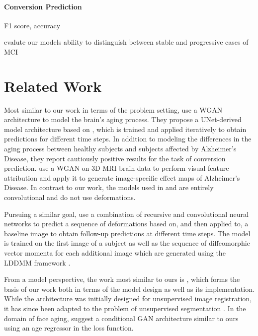 
\subsubsection*{Conversion Prediction}
F1 score, accuracy

evalute our models ability to distinguish between stable and progressive cases of MCI

\chapter{Related Work}
Most similar to our work in terms of the problem setting, \cite{wegmayr} use a WGAN architecture to model the brain's aging process. They propose a UNet-derived model architecture based on \cite{baumgartner2018visual}, which is trained and applied iteratively to obtain predictions for different time steps. In addition to modeling the differences in the aging process between healthy subjects and subjects affected by Alzheimer's Disease, they report cautiously positive results for the task of conversion prediction.
\cite{baumgartner2018visual} use a WGAN on 3D MRI brain data to perform visual feature attribution and apply it to generate image-specific effect maps of Alzheimer's Disease.
In contrast to our work, the models used in \cite{wegmayr} and \cite{baumgartner2018visual} are entirely convolutional and do not use deformations.

Pursuing a similar goal, \cite{pathan2018predictive} use a combination of recursive and convolutional neural networks to predict a sequence of deformations based on, and then applied to, a baseline image to obtain follow-up predictions at different time steps. The model is trained on the first image of a subject as well as the sequence of diffeomorphic vector momenta for each additional image which are generated using the LDDMM framework \cite{beg2005computing}.

From a model perspective, the work most similar to ours is \cite{balakrishnan2019voxelmorph} \cite{dalca2018unsupervised}, which forms the basis of our work both in terms of the model design as well as its implementation. While the architecture was initially designed for unsupervised image registration, it has since been adapted to the problem of unsupervised segmentation \cite{dalca2019unsupervised}.
In the domain of face aging, \cite{palsson2018generative} suggest a conditional GAN \cite{mirza2014conditional} architecture similar to ours using an age regressor in the loss function.

